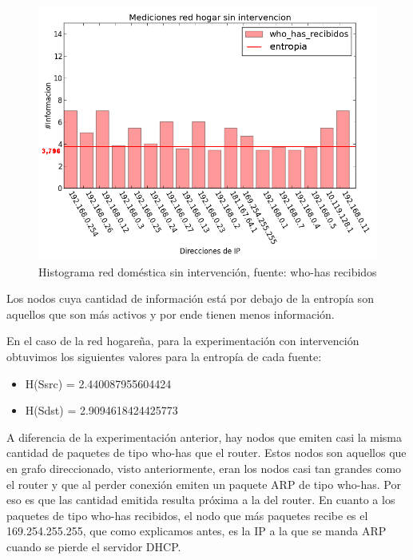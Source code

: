 \begin{figure}[!h]
	\begin{center}
		  \includegraphics[scale=0.4]{Graficos/hogar_sin_received_who_has.png}
		  \caption{Histograma red doméstica sin intervención, fuente: who-has recibidos}
		  \label{fig:contra1}
	\end{center}
\end{figure}

Los nodos cuya cantidad de información está por debajo de la entropía son aquellos que son más activos y por ende tienen menos información.

En el caso de la red hogare\~na, para la experimentación con intervención obtuvimos los siguientes valores para la entropía de cada fuente:

\begin{itemize}
\item H(Ssrc) = 2.440087955604424
\item H(Sdst) = 2.9094618424425773
\end{itemize}

A diferencia de la experimentación anterior, hay nodos que emiten casi la misma cantidad de paquetes de tipo who-has que el router. Estos nodos son aquellos que en grafo direccionado, visto anteriormente, eran los nodos casi tan grandes como el router y que al perder conexión emiten un paquete ARP de tipo who-has. Por eso es que las cantidad emitida resulta próxima a la del router.
En cuanto a los paquetes de tipo who-has recibidos, el nodo que más paquetes recibe es el 169.254.255.255, que como explicamos antes, es la IP a la que se manda ARP cuando se pierde el servidor DHCP.

